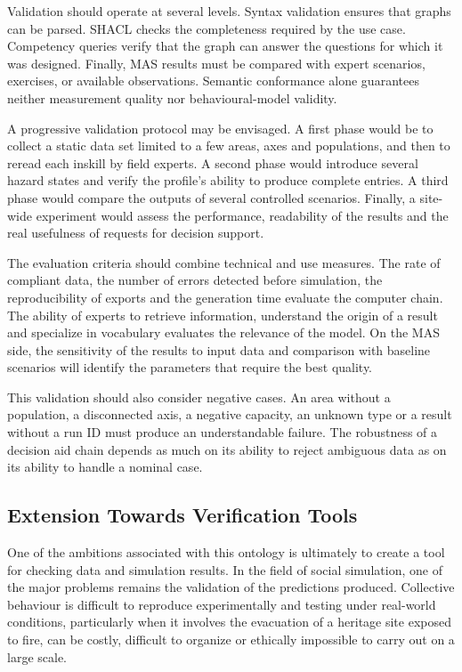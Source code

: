 \documentclass{article}
\begin{document}
Validation should operate at several levels. Syntax validation ensures that graphs can be parsed. SHACL checks the completeness required by the use case. Competency queries verify that the graph can answer the questions for which it was designed. Finally, MAS results must be compared with expert scenarios, exercises, or available observations. Semantic conformance alone guarantees neither measurement quality nor behavioural-model validity.

A progressive validation protocol may be envisaged. A first phase would be to collect a static data set limited to a few areas, axes and populations, and then to reread each inskill by field experts. A second phase would introduce several hazard states and verify the profile's ability to produce complete entries. A third phase would compare the outputs of several controlled scenarios. Finally, a site-wide experiment would assess the performance, readability of the results and the real usefulness of requests for decision support.

The evaluation criteria should combine technical and use measures. The rate of compliant data, the number of errors detected before simulation, the reproducibility of exports and the generation time evaluate the computer chain. The ability of experts to retrieve information, understand the origin of a result and specialize in vocabulary evaluates the relevance of the model. On the MAS side, the sensitivity of the results to input data and comparison with baseline scenarios will identify the parameters that require the best quality.

This validation should also consider negative cases. An area without a population, a disconnected axis, a negative capacity, an unknown type or a result without a run ID must produce an understandable failure. The robustness of a decision aid chain depends as much on its ability to reject ambiguous data as on its ability to handle a nominal case.

\subsection{Extension Towards Verification Tools}

One of the ambitions associated with this ontology is ultimately to create a tool for checking data and simulation results. In the field of social simulation, one of the major problems remains the validation of the predictions produced. Collective behaviour is difficult to reproduce experimentally and testing under real-world conditions, particularly when it involves the evacuation of a heritage site exposed to fire, can be costly, difficult to organize or ethically impossible to carry out on a large scale.
\end{document}
